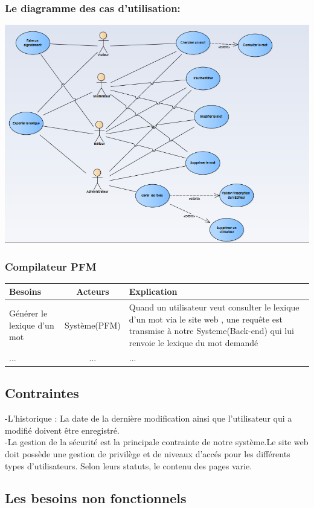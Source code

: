 \documentclass[12pt,a4paper]{article}
\begin{document}
\subsubsection{Le diagramme des cas d'utilisation:}
  \includegraphics[width=18cm]{img/Diagram_UseCase.PNG}

\subsubsection{Compilateur PFM}
\begin{tabularx}{\textwidth}{|l|c|X|}
  \hline
  Besoins & Acteurs & Explication \\
  \hline
  Générer le lexique d'un mot &
  Système(PFM)
  & Quand un utilisateur veut consulter le lexique d'un mot via le site web , une requête est transmise à notre Systeme(Back-end) qui lui renvoie le lexique du mot demandé \\
  \hline
  ...
  & ... 
  & ... \\

  \hline
\end{tabularx}
\subsection{Contraintes}
-L'historique : La date de la dernière modification ainsi que l'utilisateur qui a modifié doivent être enregistré.\\
-La gestion de la sécurité est la principale contrainte de notre système.Le site web doit possède une gestion de privilège et de niveaux d'accés pour les différents types d'utilisateurs. Selon leurs statuts, le contenu des pages varie.
\subsection{Les besoins non fonctionnels}
\end{document}
